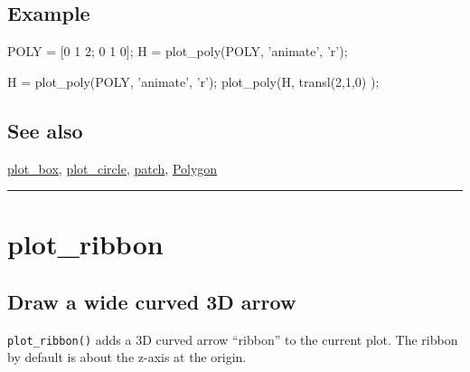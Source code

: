 \subsection*{Example}
\begin{Code}
    POLY = [0 1 2; 0 1 0];
    H = plot_poly(POLY, 'animate', 'r'); %

    H = plot_poly(POLY, 'animate', 'r'); %
    plot_poly(H, transl(2,1,0) );  %

\end{Code}

\subsection*{See also}


\hyperlink{plot_box}{\color{blue} plot\_box}, \hyperlink{plot_circle}{\color{blue} plot\_circle}, \hyperlink{patch}{\color{blue} patch}, \hyperlink{Polygon}{\color{blue} Polygon}

\vspace{1.5ex}\rule{\textwidth}{1mm}

\hypertarget{plot\_ribbon}{\section*{plot\_ribbon}}
\subsection*{Draw a wide curved 3D arrow}


\texttt{plot\_ribbon()} adds a 3D curved arrow ``ribbon'' to the current plot.  The ribbon by
default is about the z-axis at the origin.


